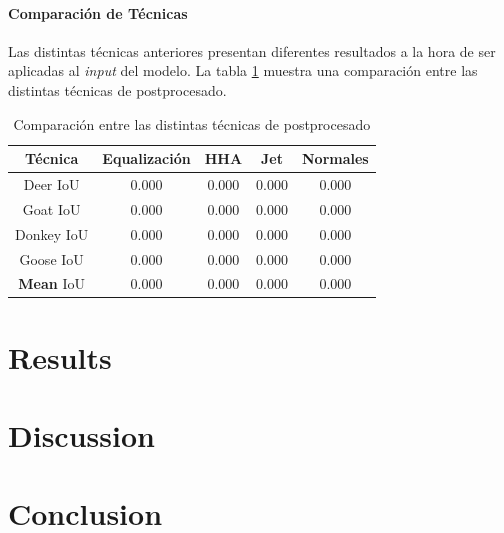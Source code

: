 \documentclass[12pt,a4paper]{report}
\begin{document}
\subsubsection{Comparación de Técnicas}
\label{subsubsec:techniques_comparison}
Las distintas técnicas anteriores presentan diferentes resultados a la hora de ser aplicadas al \textit{input} del modelo. La tabla \ref{tab:techniques-comparison} muestra una comparación entre las distintas técnicas de postprocesado.
\begin{table}[!h]
    \centering
    \begin{tabular}{|c|c|c|c|c|}
        \hline
        Técnica & Equalización & HHA & Jet & Normales \\
        \hline
        \hline
        Deer IoU & 0.000 & 0.000 & 0.000 & 0.000 \\
        \hline
        Goat IoU & 0.000 & 0.000 & 0.000 & 0.000 \\
        \hline
        Donkey IoU & 0.000 & 0.000 & 0.000 & 0.000 \\
        \hline
        Goose IoU & 0.000 & 0.000 & 0.000 & 0.000 \\
        \hline
        \textbf{Mean} IoU & 0.000 & 0.000 & 0.000 & 0.000 \\
        \hline
    \end{tabular}
    \caption{Comparación entre las distintas técnicas de postprocesado}
    \label{tab:techniques-comparison}
\end{table}

\chapter{Results}
\label{chap:results}

\chapter{Discussion}
\label{chap:discussion}

\chapter{Conclusion}
\label{chap:conclusion}




\appendix
\label{app:appendix_a}
\end{document}
